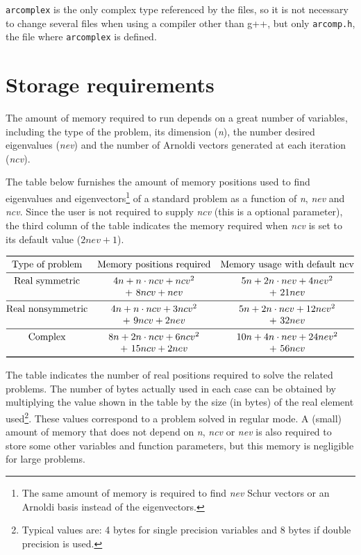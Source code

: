 \texttt{arcomplex} is the only complex type referenced by the \ARPP{} files, so it is not necessary to change several files when using a compiler other than g++, but only \texttt{arcomp.h}, the file where \texttt{arcomplex} is defined.

\section{Storage requirements}

The amount of memory required to run \ARPP{} depends on a great number of variables, including the type of the problem, its dimension (\textit{n}), the number desired eigenvalues (\textit{nev}) and the number of Arnoldi vectors generated at each iteration (\textit{ncv}).

The table below furnishes the amount of memory positions used to find eigenvalues and eigenvectors\footnote{The same amount of memory is required to find \textit{nev} Schur vectors or an Arnoldi basis instead of the eigenvectors.} of a standard problem as a function of \textit{n}, \textit{nev} and \textit{ncv}. Since the user is not required to supply \textit{ncv} (this is a optional parameter), the third column of the table indicates the memory required when \textit{ncv} is set to its default value ($2nev+1$).

\begin{center}
	\renewcommand{\arraystretch}{1.2}
	$\begin{array}{@{}ccc@{}}\toprule
	\text{Type of problem} & \text{Memory positions required} & \text{Memory usage with default ncv} \\\midrule
	\text{Real symmetric} & 4 n + n\cdot ncv + ncv^2 & 5n + 2 n\cdot nev + 4 nev^2\\
	& +\ 8 ncv + nev &  +\ 21 nev \\\midrule
	\text{Real nonsymmetric} & 4n + n\cdot ncv + 3ncv^2 & 5n + 2n\cdot nev + 12nev^2\\
	& +\ 9ncv + 2nev & +\ 32nev\\\midrule
	\text{Complex} & 8n + 2n\cdot ncv + 6ncv^2 & 10n + 4n\cdot nev + 24nev^2\\
	& +\ 15ncv + 2nev & +\ 56nev\\\bottomrule
	\end{array}$
\end{center}

The table indicates the number of real positions required to solve the related problems. The number of bytes actually used in each case can be obtained by multiplying the value shown in the table by the size (in bytes) of the real element used\footnote{Typical values are: 4 bytes for single precision variables and 8 bytes if double precision is used.}. These values correspond to a problem solved in regular mode. A (small) amount of memory that does not depend on \textit{n}, \textit{ncv} or \textit{nev} is also required to store some other \ARPP{} variables and function parameters, but this memory is negligible for large problems.

